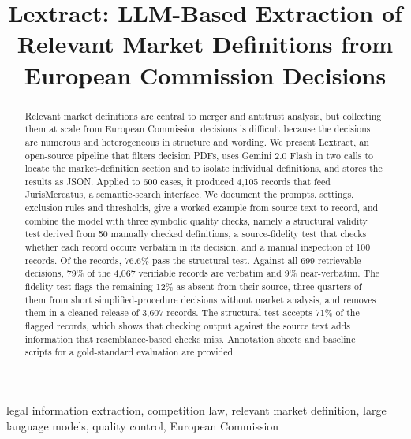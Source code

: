 \documentclass{IOS-Book-Article}
\begin{document}
\begin{frontmatter}

\title{Lextract: LLM-Based Extraction of Relevant Market Definitions from
European Commission Decisions}

\author{%
}
\address{Independent Researcher, United States}

\begin{abstract}
Relevant market definitions are central to merger and antitrust analysis, but
collecting them at scale from European Commission decisions is difficult because
the decisions are numerous and heterogeneous in structure and wording. We present
Lextract, an open-source pipeline that filters decision PDFs, uses Gemini 2.0
Flash in two calls to locate the market-definition section and to isolate
individual definitions, and stores the results as JSON. Applied to 600 cases, it
produced 4,105 records that feed JurisMercatus, a semantic-search interface. We
document the prompts, settings, exclusion rules and thresholds, give a worked
example from source text to record, and combine the model with three symbolic
quality checks, namely a structural validity test derived from 50 manually
checked definitions, a source-fidelity test that checks whether each record
occurs verbatim in its decision, and a manual inspection of 100 records. Of the
records, 76.6\% pass the structural test. Against all 699 retrievable
decisions, 79\% of the 4,067 verifiable records are verbatim and 9\%
near-verbatim. The fidelity test flags the remaining 12\% as absent from their
source, three quarters of them from short simplified-procedure decisions without
market analysis, and removes them in a cleaned release of 3,607 records. The
structural test accepts 71\% of the flagged records, which shows that checking
output against the source text adds information that resemblance-based checks
miss. Annotation sheets and baseline scripts for a gold-standard evaluation are
provided.
\end{abstract}

\begin{keyword}
legal information extraction\sep
competition law\sep
relevant market definition\sep
large language models\sep
quality control\sep
European Commission
\end{keyword}

\end{frontmatter}
\end{document}
